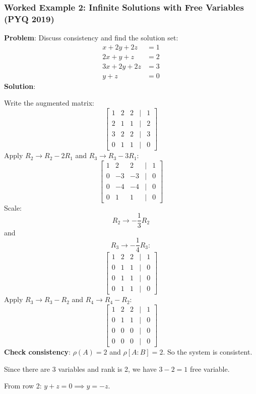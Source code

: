 \documentclass[
]{article}
\begin{document}
\subsubsection{Worked Example 2: Infinite Solutions with Free Variables
(PYQ
2019)}\label{worked-example-2-infinite-solutions-with-free-variables-pyq-2019}

\textbf{Problem}: Discuss consistency and find the solution set:
\[
\begin{aligned}
x + 2y + 2z &= 1 \\
2x + y + z &= 2 \\
3x + 2y + 2z &= 3 \\
y + z &= 0
\end{aligned}
\]
\textbf{Solution}:

Write the augmented matrix:
\[
\begin{bmatrix}
1 & 2 & 2 & | & 1 \\
2 & 1 & 1 & | & 2 \\
3 & 2 & 2 & | & 3 \\
0 & 1 & 1 & | & 0
\end{bmatrix}
\]
Apply \(R_2 \to R_2 - 2R_1\) and \(R_3 \to R_3 - 3R_1\):
\[
\begin{bmatrix}
1 & 2 & 2 & | & 1 \\
0 & -3 & -3 & | & 0 \\
0 & -4 & -4 & | & 0 \\
0 & 1 & 1 & | & 0
\end{bmatrix}
\]
Scale:
\[
R_2 \to -\frac{1}{3}R_2
\]
and
\[
R_3 \to -\frac{1}{4}R_3:
\]
\[
\begin{bmatrix}
1 & 2 & 2 & | & 1 \\
0 & 1 & 1 & | & 0 \\
0 & 1 & 1 & | & 0 \\
0 & 1 & 1 & | & 0
\end{bmatrix}
\]
Apply \(R_3 \to R_3 - R_2\) and \(R_4 \to R_4 - R_2\):
\[
\begin{bmatrix}
1 & 2 & 2 & | & 1 \\
0 & 1 & 1 & | & 0 \\
0 & 0 & 0 & | & 0 \\
0 & 0 & 0 & | & 0
\end{bmatrix}
\]
\textbf{Check consistency}: \(\rho(A) = 2\) and \(\rho[A:B] = 2\). So
the system is consistent.

Since there are 3 variables and rank is 2, we have \(3 - 2 = 1\) free
variable.

From row 2: \(y + z = 0 \implies y = -z\).
\end{document}
